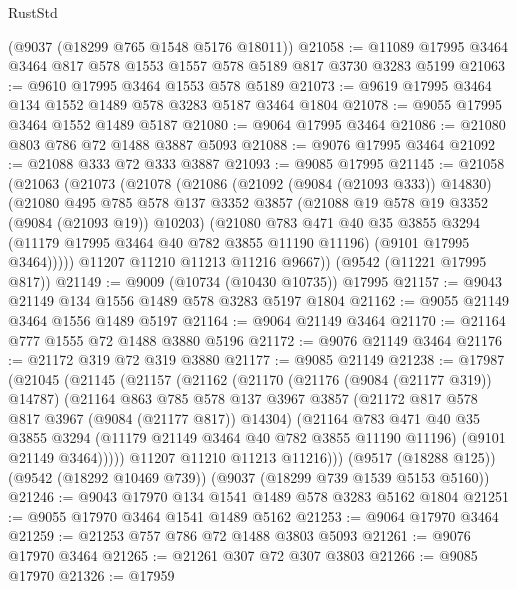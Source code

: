 \begin{lexlean}{RustStd}
\begin{coremodule}
    (@9037 (@18299 @765 @1548 @5176 @18011))
@21058 := @11089 @17995 @3464 @3464 @817 @578 @1553 @1557 @578 @5189 @817 @3730 @3283 @5199
@21063 := @9610 @17995 @3464 @1553 @578 @5189
@21073 := @9619 @17995 @3464 @134 @1552 @1489 @578 @3283 @5187 @3464 @1804
@21078 := @9055 @17995 @3464 @1552 @1489 @5187
@21080 := @9064 @17995 @3464
@21086 := @21080 @803 @786 @72 @1488 @3887 @5093
@21088 := @9076 @17995 @3464
@21092 := @21088 @333 @72 @333 @3887
@21093 := @9085 @17995
@21145 := @21058
    (@21063
      (@21073
        (@21078
          (@21086
            (@21092 (@9084 (@21093 @333)) @14830)
            (@21080
              @495
              @785
              @578
              @137
              @3352
              @3857
              (@21088 @19 @578 @19 @3352 (@9084 (@21093 @19)) @10203)
              (@21080
                @783
                @471
                @40
                @35
                @3855
                @3294
                (@11179 @17995 @3464 @40 @782 @3855 @11190 @11196)
                (@9101 @17995 @3464)))))
        @11207
        @11210
        @11213
        @11216
        @9667))
    (@9542 (@11221 @17995 @817))
@21149 := @9009 (@10734 (@10430 @10735)) @17995
@21157 := @9043 @21149 @134 @1556 @1489 @578 @3283 @5197 @1804
@21162 := @9055 @21149 @3464 @1556 @1489 @5197
@21164 := @9064 @21149 @3464
@21170 := @21164 @777 @1555 @72 @1488 @3880 @5196
@21172 := @9076 @21149 @3464
@21176 := @21172 @319 @72 @319 @3880
@21177 := @9085 @21149
@21238 := @17987
    (@21045
      (@21145
        (@21157
          (@21162
            (@21170
              (@21176 (@9084 (@21177 @319)) @14787)
              (@21164
                @863
                @785
                @578
                @137
                @3967
                @3857
                (@21172 @817 @578 @817 @3967 (@9084 (@21177 @817)) @14304)
                (@21164
                  @783
                  @471
                  @40
                  @35
                  @3855
                  @3294
                  (@11179 @21149 @3464 @40 @782 @3855 @11190 @11196)
                  (@9101 @21149 @3464)))))
          @11207
          @11210
          @11213
          @11216)))
    (@9517 (@18288 @125))
    (@9542 (@18292 @10469 @739))
    (@9037 (@18299 @739 @1539 @5153 @5160))
@21246 := @9043 @17970 @134 @1541 @1489 @578 @3283 @5162 @1804
@21251 := @9055 @17970 @3464 @1541 @1489 @5162
@21253 := @9064 @17970 @3464
@21259 := @21253 @757 @786 @72 @1488 @3803 @5093
@21261 := @9076 @17970 @3464
@21265 := @21261 @307 @72 @307 @3803
@21266 := @9085 @17970
@21326 := @17959

\end{coremodule}
\end{lexlean}
